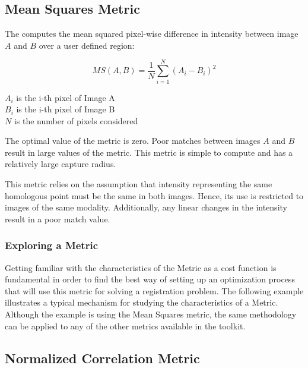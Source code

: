 \subsection{Mean Squares Metric}
\label{sec:MeanSquaresMetricv4}

The  computes the mean squared
pixel-wise difference in intensity between image $A$ and $B$ over a user
defined region:

\begin{equation}
MS(A,B) = \frac{1}{N} \sum_{i=1}^N \left( A_i - B_i \right)^2
\end{equation}
\begin{center}
$A_i$ is the i-th pixel of Image A\\
$B_i$ is the i-th pixel of Image B\\
$N$ is the number of pixels considered
\end{center}

The optimal value of the metric is zero. Poor matches between images $A$ and
$B$ result in large values of the metric. This metric is simple to compute and
has a relatively large capture radius.

This metric relies on the assumption that intensity representing the same
homologous point must be the same in both images. Hence, its use is restricted
to images of the same modality. Additionally, any linear changes in the
intensity result in a poor match value.

\subsubsection{Exploring a Metric}
\label{sec:ExploringAMetric}

Getting familiar with the characteristics of the Metric as a cost function is
fundamental in order to find the best way of setting up an optimization process
that will use this metric for solving a registration problem. The following
example illustrates a typical mechanism for studying the characteristics of a
Metric. Although the example is using the Mean Squares metric, the same
methodology can be applied to any of the other metrics available in the
toolkit.

\ifitkFullVersion

\fi


\subsection{Normalized Correlation Metric}
\label{sec:NormalizedCorrelationMetric}

